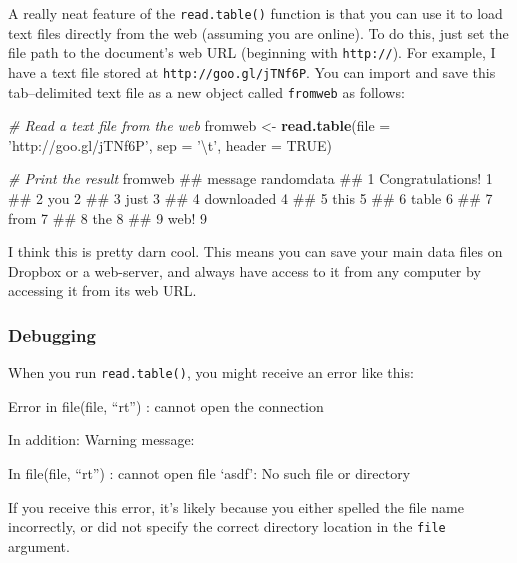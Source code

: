 \documentclass[]{book}
\newenvironment{Shaded}{\begin{snugshade}}{\end{snugshade}}
\newcommand{\KeywordTok}[1]{\textcolor[rgb]{0.13,0.29,0.53}{\textbf{#1}}}
\newcommand{\DataTypeTok}[1]{\textcolor[rgb]{0.13,0.29,0.53}{#1}}
\newcommand{\CharTok}[1]{\textcolor[rgb]{0.31,0.60,0.02}{#1}}
\newcommand{\StringTok}[1]{\textcolor[rgb]{0.31,0.60,0.02}{#1}}
\newcommand{\CommentTok}[1]{\textcolor[rgb]{0.56,0.35,0.01}{\textit{#1}}}
\newcommand{\OtherTok}[1]{\textcolor[rgb]{0.56,0.35,0.01}{#1}}
\newcommand{\NormalTok}[1]{#1}
\theoremstyle{definition}
\theoremstyle{definition}
\theoremstyle{remark}
\begin{document}
A really neat feature of the \texttt{read.table()} function is that you
can use it to load text files directly from the web (assuming you are
online). To do this, just set the file path to the document's web URL
(beginning with \texttt{http://}). For example, I have a text file
stored at \texttt{http://goo.gl/jTNf6P}. You can import and save this
tab--delimited text file as a new object called \texttt{fromweb} as
follows:

\begin{Shaded}
\begin{Highlighting}[]
\CommentTok{# Read a text file from the web}
\NormalTok{fromweb <-}\StringTok{ }\KeywordTok{read.table}\NormalTok{(}\DataTypeTok{file =} \StringTok{'http://goo.gl/jTNf6P'}\NormalTok{,}
                      \DataTypeTok{sep =} \StringTok{'}\CharTok{\textbackslash{}t}\StringTok{'}\NormalTok{,}
                      \DataTypeTok{header =} \OtherTok{TRUE}\NormalTok{)}

\CommentTok{# Print the result}
\NormalTok{fromweb}
\NormalTok{##            message randomdata}
\NormalTok{## 1 Congratulations!          1}
\NormalTok{## 2              you          2}
\NormalTok{## 3             just          3}
\NormalTok{## 4       downloaded          4}
\NormalTok{## 5             this          5}
\NormalTok{## 6            table          6}
\NormalTok{## 7             from          7}
\NormalTok{## 8              the          8}
\NormalTok{## 9             web!          9}
\end{Highlighting}
\end{Shaded}

I think this is pretty darn cool. This means you can save your main data
files on Dropbox or a web-server, and always have access to it from any
computer by accessing it from its web URL.

\subsubsection*{Debugging}\label{debugging-1}

When you run \texttt{read.table()}, you might receive an error like
this:

Error in file(file, ``rt'') : cannot open the connection

In addition: Warning message:

In file(file, ``rt'') : cannot open file `asdf': No such file or
directory

If you receive this error, it's likely because you either spelled the
file name incorrectly, or did not specify the correct directory location
in the \texttt{file} argument.
\end{document}
